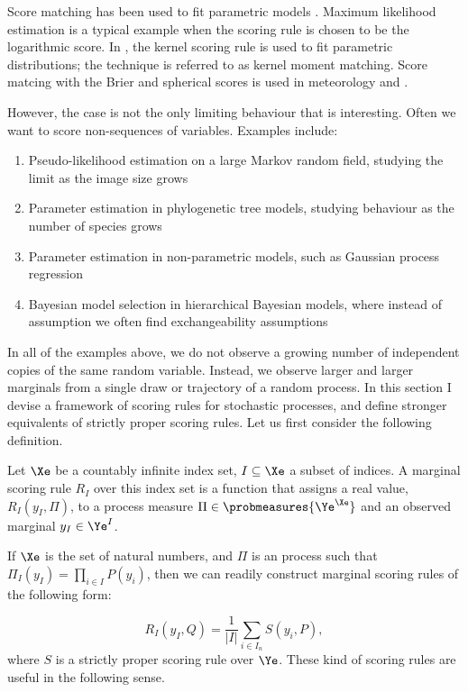 Score matching has been used to fit parametric models . Maximum likelihood estimation is a typical example when the scoring rule is chosen to be the logarithmic score. In \cite{kernelmomentmatching}, the kernel scoring rule is used to fit parametric distributions; the technique is referred to as kernel moment matching. Score matcing with the Brier and spherical scores is used in meteorology and .

However, the \iid case is not the only limiting behaviour that is interesting. Often we want to score non-\iid sequences of variables. Examples include:
\begin{enumerate}
	\item Pseudo-likelihood estimation on a large Markov random field, studying the limit as the image size grows
	\item Parameter estimation in phylogenetic tree models, studying behaviour as the number of species grows
	\item Parameter estimation in non-parametric models, such as Gaussian process regression
	\item Bayesian model selection in hierarchical Bayesian models, where instead of \iid assumption we often find exchangeability assumptions
\end{enumerate}

In all of the examples above, we do not observe a growing number of independent copies of the same random variable. Instead, we observe larger and larger marginals from a single draw or trajectory of a random process. In this section I devise a framework of scoring rules for stochastic processes, and define stronger equivalents of strictly proper scoring rules. Let us first consider the following definition.

\begin{definition}
Let $\Xe$ be a countably infinite index set, $I\subseteq\Xe$ a subset of indices. A marginal scoring rule $R_I$ over this index set is a function that assigns a real value, $R_{I}(y_{I},\Pi)$,  to a process measure $\Pi\in\probmeasures{\Ye^{\Xe}}$ and an observed marginal $y_{I}\in\Ye^{I}$.
\end{definition}

If $\Xe$ is the set of natural numbers, and $\Pi$ is an \iid process such that $\Pi_{I}(y_{I}) = \prod_{i\in I} P(y_i)$, then we can readily construct marginal scoring rules of the following form:

\begin{equation}
R_{I}(y_{I},Q) = \frac{1}{\vert I \vert} \sum_{i\in I_n} S(y_i,P)\label{eqn:decompose},
\end{equation}
where $S$ is a strictly proper scoring rule over $\Ye$. These kind of scoring rules are useful in the following sense.

